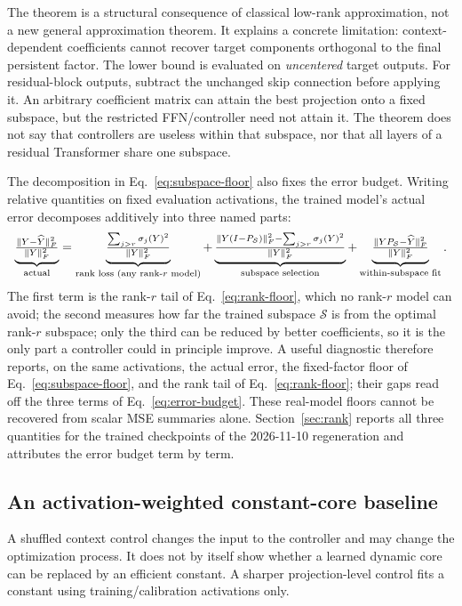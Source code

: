 The theorem is a structural consequence of classical low-rank approximation,
not a new general approximation theorem. It explains a concrete limitation:
context-dependent coefficients cannot recover target components orthogonal to
the final persistent factor. The lower bound is evaluated on \emph{uncentered}
target outputs. For residual-block outputs, subtract the unchanged skip
connection before applying it. An arbitrary coefficient matrix can attain the
best projection onto a fixed subspace, but the restricted FFN/controller need
not attain it. The theorem does not say that controllers are useless within
that subspace, nor that all layers of a residual Transformer share one subspace.

The decomposition in Eq.~\eqref{eq:subspace-floor} also fixes the error
budget. Writing relative quantities on fixed evaluation activations, the
trained model's actual error decomposes additively into three named parts:
\begin{equation}
 \underbrace{\tfrac{\lVert Y-\widehat Y\rVert_F^2}{\lVert Y\rVert_F^2}}_{\text{actual}}
 =\underbrace{\tfrac{\sum_{j>r}\sigma_j(Y)^2}{\lVert Y\rVert_F^2}}_{\text{rank loss (any rank-}r\text{ model)}}
 +\underbrace{\tfrac{\lVert Y(I-P_{\mathcal S})\rVert_F^2-\sum_{j>r}\sigma_j(Y)^2}{\lVert Y\rVert_F^2}}_{\text{subspace selection}}
 +\underbrace{\tfrac{\lVert YP_{\mathcal S}-\widehat Y\rVert_F^2}{\lVert Y\rVert_F^2}}_{\text{within-subspace fit}}.
 \label{eq:error-budget}
\end{equation}
The first term is the rank-$r$ tail of Eq.~\eqref{eq:rank-floor}, which no
rank-$r$ model can avoid; the second measures how far the trained subspace
$\mathcal S$ is from the optimal rank-$r$ subspace; only the third can be
reduced by better coefficients, so it is the only part a controller could
in principle improve. A useful diagnostic therefore reports, on the same
activations, the actual error, the fixed-factor floor of
Eq.~\eqref{eq:subspace-floor}, and the rank tail of Eq.~\eqref{eq:rank-floor};
their gaps read off the three terms of Eq.~\eqref{eq:error-budget}. These
real-model floors cannot be recovered from scalar MSE summaries alone.
Section~\ref{sec:rank} reports all three quantities for the trained
checkpoints of the 2026-11-10 regeneration and attributes the error budget
term by term.

\subsection{An activation-weighted constant-core baseline}
A shuffled context control changes the input to the controller and may change
the optimization process. It does not by itself show whether a learned dynamic
core can be replaced by an efficient constant. A sharper projection-level
control fits a constant using training/calibration activations only.

